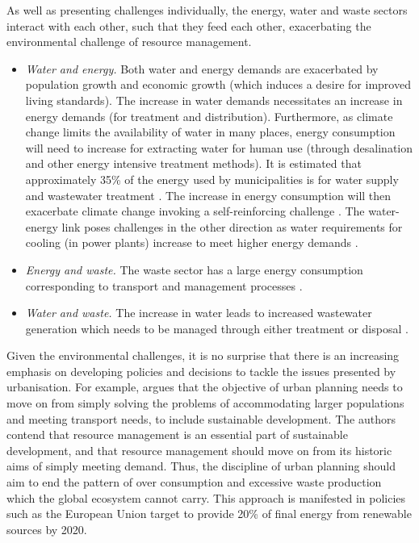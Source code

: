 As well as presenting challenges individually, the energy, water and waste sectors interact with each other, such that they feed each other, exacerbating the environmental challenge of resource management. 
\begin{itemize}
	\item \emph{Water and energy.} Both water and energy demands are exacerbated by population growth and economic growth (which induces a desire for improved living standards). The increase in water demands necessitates an increase in energy demands (for treatment and distribution). Furthermore, as climate change limits the availability of water in many places, energy consumption will need to increase for extracting water for human use (through desalination and other energy intensive treatment methods). It is estimated that approximately 35\% of the energy used by municipalities is for water supply and wastewater treatment \citep{El2005}. The increase in energy consumption will then exacerbate climate change invoking a self-reinforcing challenge \citep{Webber2011}. The water-energy link poses challenges in the other direction as water requirements for cooling (in power plants) increase to meet higher energy demands \citep{McMahon2011}. 
	\item \emph{Energy and waste.} The waste sector has a large energy consumption corresponding to transport and management processes \citep{ICE2011}.
	\item \emph{Water and waste.} The increase in water leads to increased wastewater generation which needs to be managed through either treatment or disposal \citep{McMahon2011}. 
\end{itemize}

Given the environmental challenges, it is no surprise that there is an increasing emphasis on developing policies and decisions to tackle the issues presented by urbanisation. For example, \citet{Agudelo-Vera2011} argues that the objective of urban planning needs to move on from simply solving the problems of accommodating larger populations and meeting transport needs, to include sustainable development. The authors contend that resource management is an essential part of sustainable development, and that resource management should move on from its historic aims of simply meeting demand. Thus, the discipline of urban planning should aim to end the pattern of over consumption and excessive waste production which the global ecosystem cannot carry. This approach is manifested in policies such as the European Union target to provide 20\% of final energy from renewable sources by 2020.

